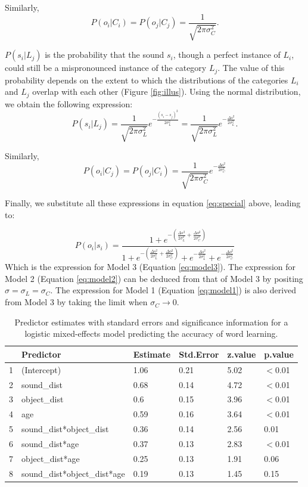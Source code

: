 \documentclass[english,,man]{apa6}
\begin{document}
Similarly, \[P(o_i | C_i) = P(o_j | C_j) = \frac{1}{\sqrt{2\pi\sigma^2_C}}.\]

\(P(s_i | L_j)\) is the probability that the sound \(s_i\), though a perfect instance of \(L_i\), could still be a mispronounced instance of the category \(L_j\). The value of this probability depends on the extent to which the distributions of the categories \(L_i\) and \(L_j\) overlap with each other (Figure \ref{fig:illus}). Using the normal distribution, we obtain the following expression: \[P(s_i| L_j) = \frac{1}{\sqrt{2\pi\sigma^2_L}} e^{-\frac{(s_i-s_j)^2}{2\sigma^2_L}} = \frac{1}{\sqrt{2\pi\sigma^2_L}} e^{-\frac{\Delta s^2}{2\sigma^2_L}}.\]

Similarly, \[P(o_i| C_j) = P(o_j| C_i) = \frac{1}{\sqrt{2\pi\sigma^2_C}} e^{-\frac{\Delta o^2}{2\sigma^2_C}} \]

Finally, we substitute all these expressions in equation \ref{eq:special} above, leading to:

\[P(o_i|s_i)= \frac{1 + e^{- (\frac{\Delta s^2}{2\sigma_L^2}+ \frac{\Delta o^2}{2\sigma_C^2})}}{1 + e^{-(\frac{\Delta s^2}{2\sigma_L^2}+ \frac{\Delta o^2}{2\sigma_C^2})}+ e^{-\frac{\Delta s^2}{2\sigma_L^2}} + e^{-\frac{\Delta o^2}{2\sigma_C^2}}}\]
Which is the expression for Model 3 (Equation \ref{eq:model3}). The expression for Model 2 (Equation \ref{eq:model2}) can be deduced from that of Model 3 by positing \(\sigma= \sigma_L = \sigma_C\). The expression for Model 1 (Equation \ref{eq:model1}) is also derived from Model 3 by taking the limit when \(\sigma_C \rightarrow 0\).

\vspace{1em}

 \vspace{1em}

\begin{table}[ht]
\centering
\begin{tabular}{rlllll}
  \hline
 & Predictor & Estimate & Std.Error & z.value & p.value \\ 
  \hline
1 & (Intercept) & 1.06 & 0.21 & 5.02 & $<$0.01 \\ 
  2 & sound\_dist & 0.68 & 0.14 & 4.72 & $<$0.01 \\ 
  3 & object\_dist & 0.6 & 0.15 & 3.96 & $<$0.01 \\ 
  4 & age & 0.59 & 0.16 & 3.64 & $<$0.01 \\ 
  5 & sound\_dist*object\_dist & 0.36 & 0.14 & 2.56 & 0.01 \\ 
  6 & sound\_dist*age & 0.37 & 0.13 & 2.83 & $<$0.01 \\ 
  7 & object\_dist*age & 0.25 & 0.13 & 1.91 & 0.06 \\ 
  8 & sound\_dist*object\_dist*age & 0.19 & 0.13 & 1.45 & 0.15 \\ 
   \hline
\end{tabular}
\caption{Predictor estimates with standard errors and significance information for a logistic mixed-effects model predicting the accuracy of word learning.} 
\end{table}
\end{document}
